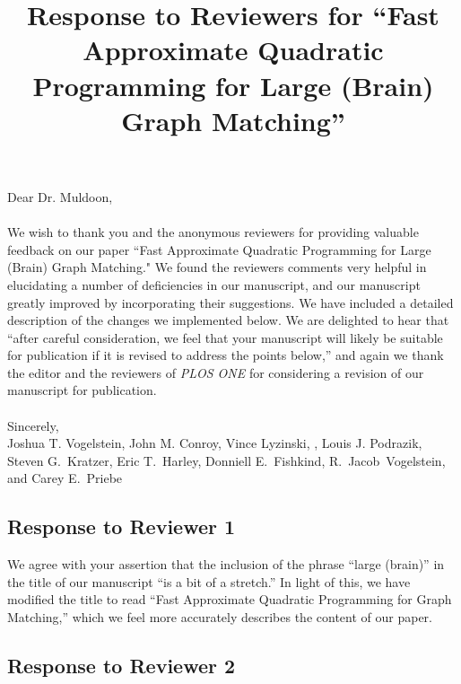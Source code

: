 \documentclass[10pt]{article}
\begin{document}
\date{}
\title{Response to Reviewers for ``Fast Approximate Quadratic Programming for Large (Brain) Graph Matching'' }
\maketitle 
\noindent Dear Dr. Muldoon,\\
\\
\noindent We wish to thank you and the anonymous reviewers for
providing valuable feedback on our paper ``Fast Approximate Quadratic Programming for Large (Brain) Graph Matching."  We found the reviewers comments very helpful in elucidating a number of deficiencies in our manuscript, and our manuscript greatly improved by incorporating their suggestions.  We have included a detailed description of the changes we implemented below.  We are delighted to hear
that ``after careful consideration, we feel that your manuscript will likely be suitable for publication if it is revised to address the points below,'' and again we thank the editor and the reviewers of
{\em PLOS ONE} for considering a revision of our manuscript for publication.\\ \\
Sincerely, \\ 
Joshua T. Vogelstein, John M. Conroy, Vince Lyzinski,
, Louis J. Podrazik,  Steven G.~Kratzer, Eric T.~Harley,
Donniell E.~Fishkind, 
    R.~Jacob~Vogelstein,
        and Carey E.~Priebe



\subsection*{Response to Reviewer 1}
We agree with your assertion that the inclusion of the phrase ``large (brain)'' in the title of our manuscript ``is a bit of a stretch.''  In light of this, we have modified the title to read ``Fast Approximate Quadratic Programming for Graph Matching,'' which we feel more accurately describes the content of our paper. 

\subsection*{Response to Reviewer 2}
\end{document}
